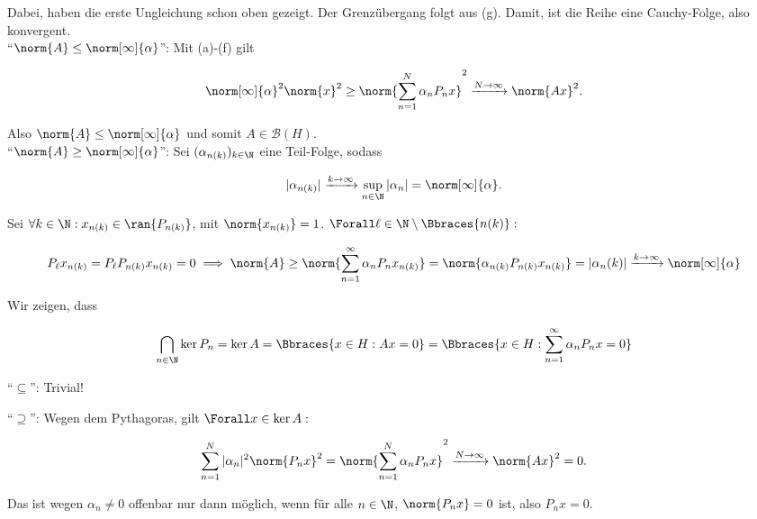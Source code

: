 \begin{solution}
Dabei, haben die erste Ungleichung schon oben gezeigt.
Der Grenzübergang folgt aus (g).
Damit, ist die Reihe eine Cauchy-Folge, also konvergent. \\

\enquote{$\norm{A} \leq \norm[\infty]{\alpha}$}:
Mit (a)-(f) gilt

\begin{align*}
    \norm[\infty]{\alpha}^2 \norm{x}^2
    \geq
    \norm{\sum_{n = 1}^N \alpha_n P_n x}^2
    \xrightarrow{N \to \infty}
    \norm{A x}^2.
\end{align*}

Also $\norm{A} \leq \norm[\infty]{\alpha}$ und somit $A \in \mathcal{B}(H)$. \\

\enquote{$\norm{A} \geq \norm[\infty]{\alpha}$}:
Sei $(\alpha_{n(k)})_{k \in \N}$ eine Teil-Folge, sodass

\begin{align*}
  |\alpha_{n(k)}|
  \xrightarrow{k \to \infty}
  \sup_{n \in \N} |\alpha_n|
  =
  \norm[\infty]{\alpha}.
\end{align*}

Sei $\forall k \in \N: x_{n(k)} \in \ran{P_{n(k)}}$, mit $\norm{x_{n(k)}} = 1$.
$\Forall \ell \in \N \setminus \Bbraces{n(k)}:$

\begin{align*}
  P_\ell x_{n(k)} = P_\ell P_{n(k)} x_{n(k)} = 0
  \implies
  \norm{A}
  \geq
  \norm{\sum_{n=1}^\infty \alpha_n P_n x_{n(k)}}
  =
  \norm{\alpha_{n(k)} P_{n(k)} x_{n(k)}}
  =
  |\alpha_n(k)|
  \xrightarrow{k \to \infty}
  \norm[\infty]{\alpha}
\end{align*}

Wir zeigen, dass

\begin{align*}
  \bigcap_{n \in \N} \ker{P_n}
  =
  \ker{A}
  =
  \Bbraces{x \in H: A x = 0}
  =
  \Bbraces{x \in H: \sum_{n=1}^\infty \alpha_n P_n x = 0}
\end{align*}

\enquote{$\subseteq$}:
Trivial!

\enquote{$\supseteq$}:
Wegen dem Pythagoras, gilt $\Forall x \in \ker{A}:$

\begin{align*}
    \sum_{n=1}^N |\alpha_n|^2 \norm{P_n x}^2
    =
    \norm{\sum_{n = 1}^N \alpha_n P_n x}^2
    \xrightarrow{N \rightarrow \infty}
    \norm{A x}^2 = 0.
\end{align*}

Das ist wegen $\alpha_n \neq 0$ offenbar nur dann möglich, wenn für alle $n \in \N$, $\norm{P_n x} = 0$ ist, also $P_n x = 0$. \\


\end{solution}
